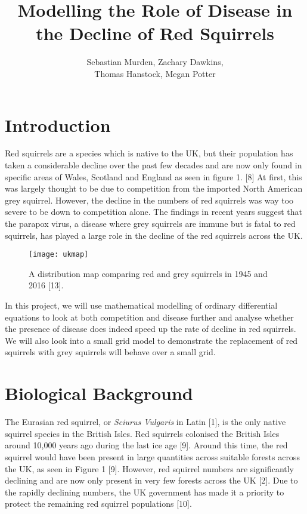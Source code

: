 \documentclass{article}
\author{Sebastian Murden, Zachary Dawkins, \\ Thomas Hanstock, Megan Potter}
\date{}
\begin{document}
\title{Modelling the Role of Disease in the Decline of Red Squirrels}
\maketitle

\tableofcontents

\section{Introduction}

Red squirrels are a species which is native to the UK, but their population has taken a considerable decline over the past few decades and are now only found in specific areas of Wales, Scotland and England as seen in figure 1. [8] At first, this was largely thought to be due to competition from the imported North American grey squirrel. However, the decline in the numbers of red squirrels was way too severe to be down to competition alone. The findings in recent years suggest that the parapox virus, a disease where grey squirrels are immune but is fatal to red squirrels, has played a large role in the decline of the red squirrels across the UK.

\begin{figure}[H]
\begin{center}
\texttt{[image: ukmap]}
\caption{A distribution map comparing red and grey squirrels in 1945 and 2016 [13].}
\end{center}
\end{figure}

In this project, we will use mathematical modelling of ordinary differential equations to look at both competition and disease further and analyse whether the presence of disease does indeed speed up the rate of decline in red squirrels.  We will also look into a small grid model to demonstrate the replacement of red squirrels with grey squirrels will behave over a small grid.




\section{Biological Background}

The Eurasian red squirrel, or \emph{Sciurus Vulgaris} in Latin [1], is the only native squirrel species in the British Isles.  Red squirrels colonised the British Isles around 10,000 years ago during the last ice age [9]. Around this time, the red squirrel would have been present in large quantities across suitable forests across the UK, as seen in Figure 1 [9]. However, red squirrel numbers are significantly declining and are now only present in very few forests across the UK [2]. Due to the rapidly declining numbers, the UK government has made it a priority to protect the remaining red squirrel populations [10].
\end{document}
